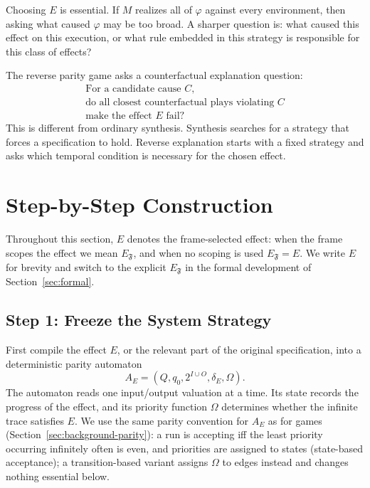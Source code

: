 \documentclass[11pt]{article}
\theoremstyle{remark}
\newcommand{\Frame}{\mathfrak{F}}
\begin{document}
Choosing \(E\) is essential. If \(M\) realizes all of \(\varphi\) against every
environment, then asking what caused \(\varphi\) may be too broad. A sharper
question is: what caused this effect on this execution, or what rule embedded
in this strategy is responsible for this class of effects?

The reverse parity game asks a counterfactual explanation question:
\[
  \begin{gathered}
    \text{For a candidate cause } C,\\
    \text{do all closest counterfactual plays violating } C\\
    \text{make the effect } E \text{ fail?}
  \end{gathered}
\]
This is different from ordinary synthesis. Synthesis searches for a strategy
that forces a specification to hold. Reverse explanation starts with a fixed
strategy and asks which temporal condition is necessary for the chosen effect.

\section{Step-by-Step Construction}

Throughout this section, \(E\) denotes the frame-selected effect: when the frame
scopes the effect we mean \(E_{\Frame}\), and when no scoping is used
\(E_{\Frame}=E\). We write \(E\) for brevity and switch to the explicit
\(E_{\Frame}\) in the formal development of Section~\ref{sec:formal}.

\subsection{Step 1: Freeze the System Strategy}
\label{step:freeze}

First compile the effect \(E\), or the relevant part of the original
specification, into a deterministic parity automaton
\[
  A_E = (Q,q_0,2^{I\cup O},\delta_E,\Omega).
\]
The automaton reads one input/output valuation at a time. Its state records the
progress of the effect, and its priority function \(\Omega\) determines whether
the infinite trace satisfies \(E\). We use the same parity convention for
\(A_E\) as for games (Section~\ref{sec:background-parity}): a run is accepting
iff the least priority occurring infinitely often is even, and priorities are
assigned to states (state-based acceptance); a transition-based variant assigns
\(\Omega\) to edges instead and changes nothing essential below.
\end{document}
